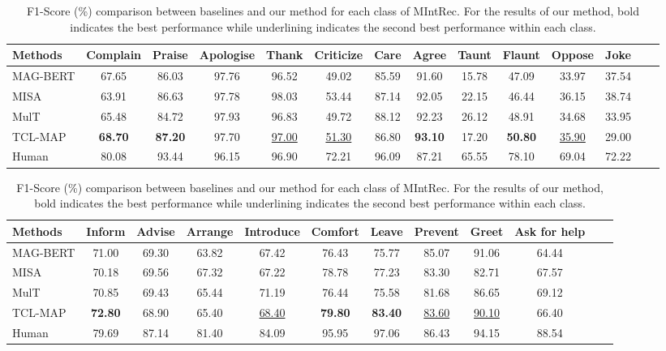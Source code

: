\documentclass[letterpaper]{article}
\begin{document}
\begin{table}[t!]
\renewcommand\tabcolsep{3pt}
\centering

\begin{tabular*}{\textwidth}{c|c@{\extracolsep{\fill}}cccccccccccc}
\toprule
\multicolumn{1}{l|}{Methods} &Complain& Praise & Apologise & Thank & Criticize  & Care & Agree & Taunt & Flaunt & Oppose & Joke   \\
\midrule
\multicolumn{1}{l|}{MAG-BERT}  & 67.65 & 86.03 & 97.76 & 96.52 & 49.02 & 85.59 & 91.60 & 15.78 & 47.09 & 33.97 & 37.54 \\
\multicolumn{1}{l|}{MISA}  & 63.91 & 86.63 & 97.78 & 98.03 & 53.44 & 87.14 & 92.05 & 22.15 & 46.44 & 36.15 & 38.74 \\
\multicolumn{1}{l|}{MulT} & 65.48 & 84.72 & 97.93 & 96.83 & 49.72& 88.12 & 92.23 & 26.12 & 48.91 & 34.68 & 33.95 \\
\multicolumn{1}{l|}{TCL-MAP}  & \textbf{68.70} & \textbf{87.20} & 97.70 & \underline{97.00} & \underline{51.30} & 86.80 & \textbf{93.10} & 17.20 & \textbf{50.80} & \underline{35.90} & 29.00 \\
\midrule
\multicolumn{1}{l|}{Human}  & 80.08 & 93.44 & 96.15 & 96.90 & 72.21 & 96.09 & 87.21 & 65.55 & 78.10 & 69.04 & 72.22 \\
\midrule
\end{tabular*}


\begin{tabular*}{\textwidth}{c|c@{\extracolsep{\fill}}cccccccccc}
\midrule
\multicolumn{1}{l|}{Methods} & Inform  &Advise & Arrange & Introduce & Comfort & Leave & Prevent & Greet & Ask for help\\
\midrule
\multicolumn{1}{l|}{MAG-BERT}  & 71.00 & 69.30 & 63.82 & 67.42 & 76.43 & 75.77 & 85.07 & 91.06 & 64.44 \\
\multicolumn{1}{l|}{MISA}  & 70.18 & 69.56 & 67.32 & 67.22 & 78.78 & 77.23 & 83.30 & 82.71 & 67.57 \\
\multicolumn{1}{l|}{MulT} & 70.85  & 69.43 & 65.44 & 71.19 & 76.44 & 75.58 & 81.68 & 86.65 & 69.12  \\
\multicolumn{1}{l|}{TCL-MAP}  & \textbf{72.80} & 68.90 & 65.40 & \underline{68.40} & \textbf{79.80} & \textbf{83.40} & \underline{83.60} & \underline{90.10} & 66.40 \\
\midrule
\multicolumn{1}{l|}{Human}  & 79.69 & 87.14 & 81.40 & 84.09 & 95.95 & 97.06 & 86.43 & 94.15 & 88.54 \\
\bottomrule
\end{tabular*}

\caption{\protect \label{results_each_classes} F1-Score (\%) comparison between baselines and our method for each class of MIntRec. For the results of our method, bold indicates the best performance while underlining indicates the second best performance within each class.
}
\end{table}
\end{document}
